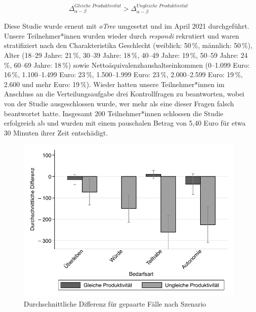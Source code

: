 \documentclass[justified,nobib,nohyper,symmetric,twoside]{tufte-book}
\begin{document}
\begin{equation}\label{eq:gleichheit}
   \Delta^{Gleiche\;Produktivit\ddot{a}t}_{\alpha-\beta}>\Delta^{Ungleiche\;Produktivit\ddot{a}t}_{\alpha-\beta}
\end{equation}

Diese Studie wurde erneut mit \textit{oTree} umgesetzt und im April 2021 durchgeführt.
Unsere Teilnehmer*innen wurden wieder durch \textit{respondi} rekrutiert und waren stratifiziert nach den Charakteristika Geschlecht (weiblich: 50\,\%, männlich: 50\,\%), Alter (18--29 Jahre: 21\,\%, 30--39 Jahre: 18\,\%, 40--49 Jahre: 19\,\%, 50--59 Jahre: 24\,\%, 60--69 Jahre: 18\,\%) sowie Nettoäquivalenzhaushaltseinkommen (0--1.099 Euro: 16\,\%, 1.100--1.499 Euro: 23\,\%, 1.500--1.999 Euro: 23\,\%, 2.000--2.599 Euro: 19\,\%, 2.600 und mehr Euro: 19\,\%).
Wieder hatten unsere Teilnehmer*innen im Anschluss an die Verteilungsaufgabe drei Kontrollfragen zu beantworten, wobei von der Studie ausgeschlossen wurde, wer mehr als eine dieser Fragen falsch beantwortet hatte.
Insgesamt 200 Teilnehmer*innen schlossen die Studie erfolgreich ab und wurden mit einem pauschalen Betrag von 5,40 Euro für etwa 30 Minuten ihrer Zeit entschädigt.

\begin{figure}[t]\label{fig:abbildung_16}
   \center
   \caption{Durchschnittliche Differenz für gepaarte Fälle nach Szenario}
   \includegraphics[width=0.99\linewidth]{figure_16.pdf}
\end{figure}
\end{document}
